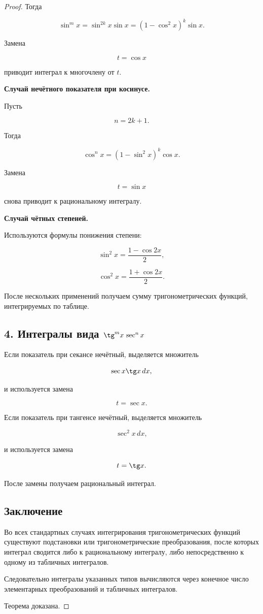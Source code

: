 \documentclass[14pt]{extreport}
\begin{document}
\begin{proof}
Тогда

\[
\sin^m x
=
\sin^{2k}x\sin x
=
(1-\cos^2x)^k\sin x.
\]

Замена

\[
t=\cos x
\]

приводит интеграл к многочлену от $t$.

\medskip

\textbf{Случай нечётного показателя при косинусе.}

Пусть

\[
n=2k+1.
\]

Тогда

\[
\cos^n x
=
(1-\sin^2x)^k\cos x.
\]

Замена

\[
t=\sin x
\]

снова приводит к рациональному интегралу.

\medskip

\textbf{Случай чётных степеней.}

Используются формулы понижения степени:

\[
\sin^2x
=
\frac{1-\cos2x}{2},
\]

\[
\cos^2x
=
\frac{1+\cos2x}{2}.
\]

После нескольких применений получаем сумму тригонометрических функций,
интегрируемых по таблице.

\subsection*{4. Интегралы вида $\tg^m x\,\sec^n x$}

Если показатель при секансе нечётный,
выделяется множитель

\[
\sec x\tg x\,dx,
\]

и используется замена

\[
t=\sec x.
\]

Если показатель при тангенсе нечётный,
выделяется множитель

\[
\sec^2x\,dx,
\]

и используется замена

\[
t=\tg x.
\]

После замены получаем рациональный интеграл.

\subsection*{Заключение}

Во всех стандартных случаях интегрирования тригонометрических функций
существуют подстановки или тригонометрические преобразования,
после которых интеграл сводится либо к рациональному интегралу,
либо непосредственно к одному из табличных интегралов.

Следовательно интегралы указанных типов вычисляются через конечное число элементарных преобразований и табличных интегралов.

Теорема доказана.
\end{proof}
\end{document}
